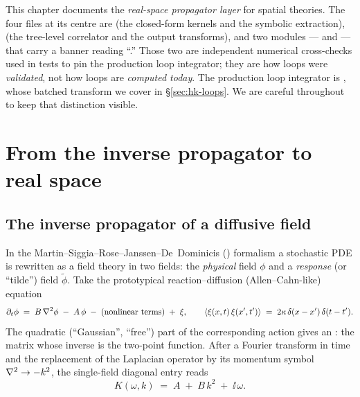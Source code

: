 \begin{note}
This chapter documents the \emph{real-space propagator layer} for spatial
\msrjd{} theories. The four files at its centre are
 (the closed-form kernels and
the symbolic extraction),  (the tree-level
correlator and the output transforms), and two modules ---
 and  --- that carry a
banner reading ``.'' Those two
are independent numerical cross-checks used in tests to pin the production
loop integrator; they are how loops were \emph{validated}, not how loops are
\emph{computed today}. The production loop integrator is
, whose batched transform
 we cover in \S\ref{sec:hk-loops}. We are
careful throughout to keep that distinction visible.
\end{note}

\section{From the inverse propagator to real space}\label{sec:hk-fromprop}

\subsection{The \msrjd{} inverse propagator of a diffusive field}

In the Martin--Siggia--Rose--Janssen--De~Dominicis (\msrjd) formalism a
stochastic PDE is rewritten as a field theory in two fields: the \emph{physical}
field $\phi$ and a \emph{response} (or ``tilde'') field $\tilde\phi$. Take the
prototypical reaction--diffusion (Allen--Cahn-like) equation
\begin{equation}
  \partial_t\phi \;=\; B\,\nabla^2\phi \;-\; A\,\phi \;-\;(\text{nonlinear terms})\;+\;\xi,
  \qquad
  \left\langle \xi(x,t)\,\xi(x',t') \right\rangle \;=\; 2\kappa\,\delta(x-x')\,\delta(t-t').
  \label{eq:hk-langevin}
\end{equation}
The quadratic (``Gaussian'', ``free'') part of the corresponding action gives an
: the matrix whose inverse is the two-point function.
After a Fourier transform in time and the replacement of the Laplacian operator
by its momentum symbol $\nabla^2 \to -k^2$, the single-field diagonal entry reads
\begin{equation}
  K(\omega,k) \;=\; A \;+\; B\,k^{2} \;+\; \ii\,\omega.
  \label{eq:hk-Kft}
\end{equation}

